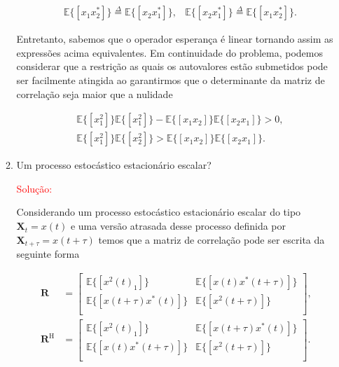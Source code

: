\documentclass[a4paper,10pt]{article}
\begin{document}
\begin{enumerate}
\begin{enumerate}
						\begin{align}
							&\mathbb{E}\{[x_{1}x^{*}_{2}]\} \overset{\Delta}{=} \mathbb{E}\{[x_{2}x^{*}_{1}]\},
							&\mathbb{E}\{[x_{2}x^{*}_{1}]\} \overset{\Delta}{=} \mathbb{E}\{[x_{1}x^{*}_{2}]\}.
						\end{align}
						
						Entretanto, sabemos que o operador esperança é linear tornando assim as expressões acima equivalentes. Em continuidade do problema, podemos 
						considerar que a restrição as quais os autovalores estão submetidos pode ser facilmente atingida ao garantirmos que o determinante da matriz 
						de correlação seja maior que a nulidade
						
						\begin{align}
							&\mathbb{E}\{[x^{2}_{1}]\} \mathbb{E}\{[x^{2}_{1}]\} - \mathbb{E}\{[x_{1}x_{2}]\} \mathbb{E}\{[x_{2}x_{1}]\} > 0, \\
							&\mathbb{E}\{[x_{1}^{2}]\} \mathbb{E}\{[x^{2}_{2}]\} > \mathbb{E}\{[x_{1}x_{2}]\} \mathbb{E}\{[x_{2}x_{1}]\}.
						\end{align}
				
					\item Um processo estocástico estacionário escalar?
					
						\textcolor{red}{Solução:}
						
						Considerando um processo estocástico estacionário escalar do tipo $\mathbf{X}_{t} = x(t)$ e uma versão atrasada desse
						processo definida por $\mathbf{X}_{t + \tau} = x(t + \tau)$ temos que a matriz de correlação pode ser escrita da seguinte forma
						
						\begin{align}
							\mathbf{R} &= \left[ 
							\begin{matrix}
								\mathbb{E}\{[x^{2}(t)_{1}]\} & \mathbb{E}\{[x(t)x^{*}(t + \tau)]\} \\
								\mathbb{E}\{[x(t + \tau)x^{*}(t)]\} & \mathbb{E}\{[x^{2}(t + \tau)]\} \\
							\end{matrix} \right], \\
							\mathbf{R}^{\text{H}} &= \left[ 
							\begin{matrix}
								\mathbb{E}\{[x^{2}(t)_{1}]\} & \mathbb{E}\{[x(t + \tau)x^{*}(t)]\} \\
								\mathbb{E}\{[x(t)x^{*}(t + \tau)]\} & \mathbb{E}\{[x^{2}(t + \tau)]\} \\
							\end{matrix} \right].
						\end{align}
						

\end{enumerate}
\end{enumerate}
\end{document}

